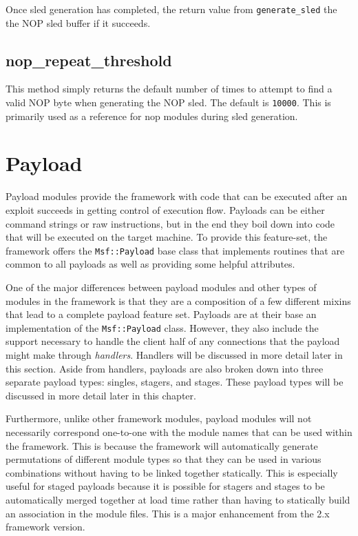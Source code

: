 \documentclass{report}
\begin{document}
\par
Once sled generation has completed, the return value from
\texttt{generate\_sled} the the NOP sled buffer if it succeeds.

        \subsection{nop\_repeat\_threshold}

\par
This method simply returns the default number of times to attempt to
find a valid NOP byte when generating the NOP sled.  The default is
\texttt{10000}.  This is primarily used as a reference for nop
modules during sled generation.

    \section{Payload}

\par
Payload modules provide the framework with code that can be executed
after an exploit succeeds in getting control of execution flow.
Payloads can be either command strings or raw instructions, but in
the end they boil down into code that will be executed on the target
machine.  To provide this feature-set, the framework offers the
\texttt{Msf::Payload} base class that implements routines that are
common to all payloads as well as providing some helpful attributes.

\par
One of the major differences between payload modules and other types
of modules in the framework is that they are a composition of a few
different mixins that lead to a complete payload feature set.
Payloads are at their base an implementation of the
\texttt{Msf::Payload} class.  However, they also include the support
necessary to handle the client half of any connections that the
payload might make through \textit{handlers}.  Handlers will be
discussed in more detail later in this section.  Aside from
handlers, payloads are also broken down into three separate payload
types: singles, stagers, and stages.  These payload types will be
discussed in more detail later in this chapter.

\par
Furthermore, unlike other framework modules, payload modules will
not necessarily correspond one-to-one with the module names that can
be used within the framework.  This is because the framework will
automatically generate permutations of different module types so
that they can be used in various combinations without having to be
linked together statically.  This is especially useful for staged
payloads because it is possible for stagers and stages to be
automatically merged together at load time rather than having to
statically build an association in the module files.  This is a
major enhancement from the 2.x framework version.
\end{document}

